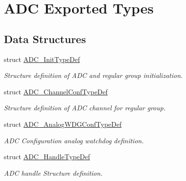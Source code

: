 \hypertarget{group___a_d_c___exported___types}{}\section{A\+DC Exported Types}
\label{group___a_d_c___exported___types}
\subsection*{Data Structures}
\begin{DoxyCompactItemize}
\item 
struct \hyperlink{struct_a_d_c___init_type_def}{A\+D\+C\+\_\+\+Init\+Type\+Def}
\begin{DoxyCompactList}\small\item\em Structure definition of A\+DC and regular group initialization. \end{DoxyCompactList}\item 
struct \hyperlink{struct_a_d_c___channel_conf_type_def}{A\+D\+C\+\_\+\+Channel\+Conf\+Type\+Def}
\begin{DoxyCompactList}\small\item\em Structure definition of A\+DC channel for regular group. \end{DoxyCompactList}\item 
struct \hyperlink{struct_a_d_c___analog_w_d_g_conf_type_def}{A\+D\+C\+\_\+\+Analog\+W\+D\+G\+Conf\+Type\+Def}
\begin{DoxyCompactList}\small\item\em A\+DC Configuration analog watchdog definition. \end{DoxyCompactList}\item 
struct \hyperlink{struct_a_d_c___handle_type_def}{A\+D\+C\+\_\+\+Handle\+Type\+Def}
\begin{DoxyCompactList}\small\item\em A\+DC handle Structure definition. \end{DoxyCompactList}\end{DoxyCompactItemize}
